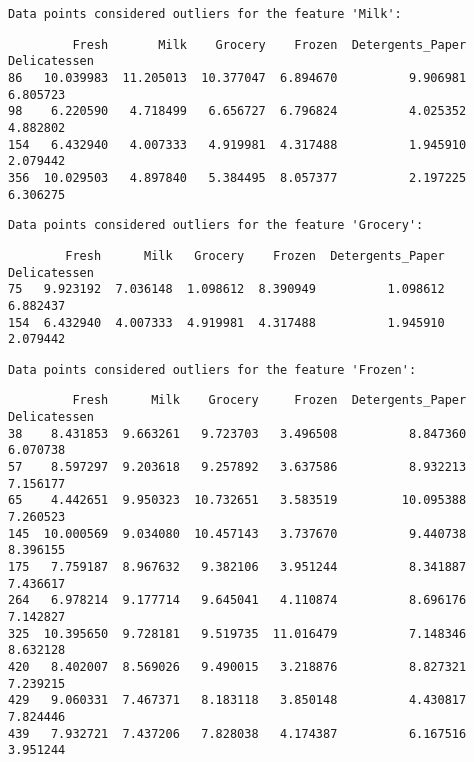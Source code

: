 \documentclass{article}
\begin{document}
    
    \begin{Verbatim}[commandchars=\\\{\}]
Data points considered outliers for the feature 'Milk':
    \end{Verbatim}

    
    \begin{verbatim}
         Fresh       Milk    Grocery    Frozen  Detergents_Paper  Delicatessen
86   10.039983  11.205013  10.377047  6.894670          9.906981      6.805723
98    6.220590   4.718499   6.656727  6.796824          4.025352      4.882802
154   6.432940   4.007333   4.919981  4.317488          1.945910      2.079442
356  10.029503   4.897840   5.384495  8.057377          2.197225      6.306275
    \end{verbatim}

    
    \begin{Verbatim}[commandchars=\\\{\}]
Data points considered outliers for the feature 'Grocery':
    \end{Verbatim}

    
    \begin{verbatim}
        Fresh      Milk   Grocery    Frozen  Detergents_Paper  Delicatessen
75   9.923192  7.036148  1.098612  8.390949          1.098612      6.882437
154  6.432940  4.007333  4.919981  4.317488          1.945910      2.079442
    \end{verbatim}

    
    \begin{Verbatim}[commandchars=\\\{\}]
Data points considered outliers for the feature 'Frozen':
    \end{Verbatim}

    
    \begin{verbatim}
         Fresh      Milk    Grocery     Frozen  Detergents_Paper  Delicatessen
38    8.431853  9.663261   9.723703   3.496508          8.847360      6.070738
57    8.597297  9.203618   9.257892   3.637586          8.932213      7.156177
65    4.442651  9.950323  10.732651   3.583519         10.095388      7.260523
145  10.000569  9.034080  10.457143   3.737670          9.440738      8.396155
175   7.759187  8.967632   9.382106   3.951244          8.341887      7.436617
264   6.978214  9.177714   9.645041   4.110874          8.696176      7.142827
325  10.395650  9.728181   9.519735  11.016479          7.148346      8.632128
420   8.402007  8.569026   9.490015   3.218876          8.827321      7.239215
429   9.060331  7.467371   8.183118   3.850148          4.430817      7.824446
439   7.932721  7.437206   7.828038   4.174387          6.167516      3.951244
    \end{verbatim}
\end{document}
